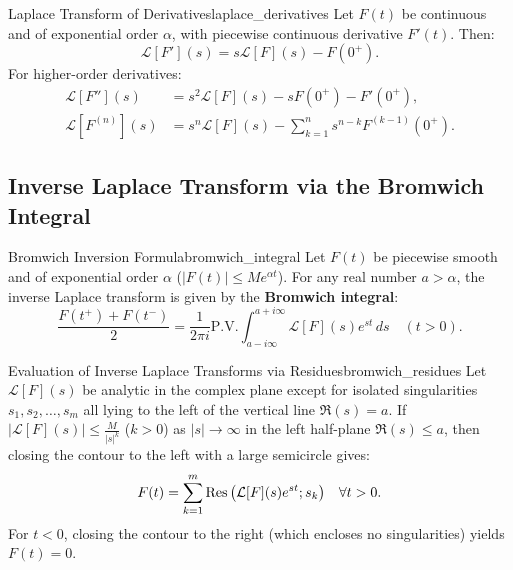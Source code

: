 \begin{theorem}{Laplace Transform of Derivatives}{laplace_derivatives}
Let $F(t)$ be continuous and of exponential order $\alpha$, with piecewise continuous derivative $F'(t)$. Then:
\begin{equation}
\mathcal{L}[F'](s) = s \mathcal{L}[F](s) - F(0^+).
\end{equation}
For higher-order derivatives:
\begin{align}
\mathcal{L}[F''](s) &= s^2 \mathcal{L}[F](s) - s F(0^+) - F'(0^+), \\
\mathcal{L}[F^{(n)}](s) &= s^n \mathcal{L}[F](s) - \sum_{k=1}^n s^{n-k} F^{(k-1)}(0^+).
\end{align}
\end{theorem}

\subsection{Inverse Laplace Transform via the Bromwich Integral}

\begin{theorem}{Bromwich Inversion Formula}{bromwich_integral}
Let $F(t)$ be piecewise smooth and of exponential order $\alpha$ ($|F(t)| \le M e^{\alpha t}$).
For any real number $a > \alpha$, the inverse Laplace transform is given by the \textbf{Bromwich integral}:
\begin{equation}
\frac{F(t^+) + F(t^-)}{2} = \frac{1}{2\pi i} \text{P.V.} \int_{a - i\infty}^{a + i\infty} \mathcal{L}[F](s) e^{st}\, ds \quad (t > 0).
\end{equation}
\end{theorem}

\begin{theorem}{Evaluation of Inverse Laplace Transforms via Residues}{bromwich_residues}
Let $\mathcal{L}[F](s)$ be analytic in the complex plane except for isolated singularities $s_1, s_2, \dots, s_m$ all lying to the left of the vertical line $\Re(s) = a$.
If $|\mathcal{L}[F](s)| \le \frac{M}{|s|^k}$ ($k > 0$) as $|s| \to \infty$ in the left half-plane $\Re(s) \le a$, then closing the contour to the left with a large semicircle gives:
\begin{equation}
F(t) = \sum_{k=1}^m \operatorname{Res}\big(\mathcal{L}[F](s) e^{st}; s_k\big) \quad \forall t > 0.
\end{equation}
For $t < 0$, closing the contour to the right (which encloses no singularities) yields $F(t) = 0$.
\end{theorem}


